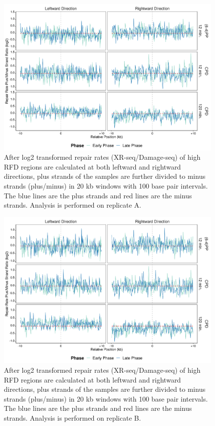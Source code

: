 \begin{figure}[H]
\begin{center}
\includegraphics[width=\textwidth]{Chapters/7_appendix/figures/supfig74}
\caption[Repair rate plus/minus ratio of high RFDs in 20 kb (replicate A).]{After log2 transformed repair rates (XR-seq/Damage-seq) of high RFD regions are calculated at both leftward and rightward directions, plus strands of the samples are further divided to minus strands (plus/minus) in 20 kb windows with 100 base pair intervals. The blue lines are the plus strands and red lines are the minus strands. Analysis is performed on replicate A.}
\label{supfig:rrpm20rfdA}
\end{center}
\end{figure}

\begin{figure}[H]
\begin{center}
\includegraphics[width=\textwidth]{Chapters/7_appendix/figures/supfig75}
\caption[Repair rate plus/minus ratio of high RFDs in 20 kb (replicate B).]{After log2 transformed repair rates (XR-seq/Damage-seq) of high RFD regions are calculated at both leftward and rightward directions, plus strands of the samples are further divided to minus strands (plus/minus) in 20 kb windows with 100 base pair intervals. The blue lines are the plus strands and red lines are the minus strands. Analysis is performed on replicate B.}
\label{supfig:rrpm20rfdB}
\end{center}
\end{figure}

